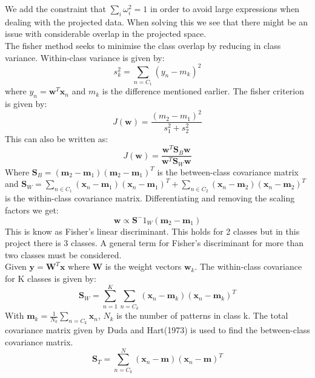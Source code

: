 We add the constraint that $\sum_i \omega^2_i  = 1$ in order to avoid large expressions when dealing with the projected data. When solving this we see that there might be an issue with considerable overlap in the projected space.\\
The fisher method seeks to minimise the class overlap by reducing in class variance. Within-class variance is given by:
\begin{equation}
s^2_k = \sum_{n=C_1} (y_n - m_k)^2
\end{equation}
where $y_n = \textbf{w}^T\textbf{x}_n$ and $m_k$ is the difference mentioned earlier. The fisher criterion is given by:
\begin{equation}
J(\textbf{w})=\frac{(m_2 - m_1)^2}{s^2_1+s^2_2}
\end{equation}
This can also be written as:
\begin{equation}
J(\textbf{w})=\frac{\textbf{w}^T\textbf{S}_B\textbf{w}}{\textbf{w}^T\textbf{S}_W\textbf{w}}
\end{equation}
Where $\textbf{S}_B = (\textbf{m}_2 - \textbf{m}_1)(\textbf{m}_2 - \textbf{m}_1)^T$ is the between-class covariance matrix and $\textbf{S}_W = \sum_{n\in C_1}(\textbf{x}_n - \textbf{m}_1)(\textbf{x}_n - \textbf{m}_1)^T + \sum_{n\in C_2}(\textbf{x}_n - \textbf{m}_2)(\textbf{x}_n - \textbf{m}_2)^T $ is the within-class covariance matrix.
Differentiating and removing the scaling factors we get:
\begin{equation}
\textbf{w} \propto \textbf{S}^-1_W ( \textbf{m}_2 - \textbf{m}_1 )
\end{equation}
This is know as Fisher's linear discriminant. This holds for 2 classes but in this project there is 3 classes. A general term for Fisher's discriminant for more than two classes must be considered.\\
Given $\textbf{y} = \textbf{W}^T\textbf{x}$ where \textbf{W} is the weight vectors $\textbf{w}_k$. The within-class covariance for K classes is given by: 
\begin{equation}
\textbf{S}_W = \sum^K_{n=1} \sum_{n=C_k} (\textbf{x}_n - \textbf{m}_k)(\textbf{x}_n - \textbf{m}_k)^T 
\end{equation}
With $\textbf{m}_k = \frac{1}{N_k}\sum_{n=C_k} \textbf{x}_n$, $N_k$ is the number of patterns in class k. The total covariance matrix given by Duda and Hart(1973) is used to find the between-class covariance matrix.
\begin{equation}
\textbf{S}_T = \sum^N_{n=C_k}(\textbf{x}_n - \textbf{m})(\textbf{x}_n - \textbf{m})^T 
\end{equation}
